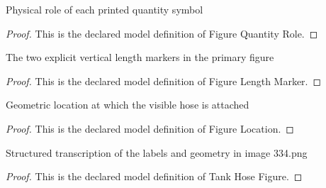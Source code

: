 \begin{definition}
  \label{def:physics:phyx-mini-0334:phyxminiproblems-problemphyxmini0334-figurequantityrole}
  Physical role of each printed quantity symbol
\end{definition}
\begin{proof}
  This is the declared model definition of Figure Quantity Role.
\end{proof}
\begin{definition}
  \label{def:physics:phyx-mini-0334:phyxminiproblems-problemphyxmini0334-figurelengthmarker}
  The two explicit vertical length markers in the primary figure
\end{definition}
\begin{proof}
  This is the declared model definition of Figure Length Marker.
\end{proof}
\begin{definition}
  \label{def:physics:phyx-mini-0334:phyxminiproblems-problemphyxmini0334-figurelocation}
  Geometric location at which the visible hose is attached
\end{definition}
\begin{proof}
  This is the declared model definition of Figure Location.
\end{proof}
\begin{definition}
  \label{def:physics:phyx-mini-0334:phyxminiproblems-problemphyxmini0334-tankhosefigure}
  Structured transcription of the labels and geometry in image 334.png
\end{definition}
\begin{proof}
  This is the declared model definition of Tank Hose Figure.
\end{proof}
